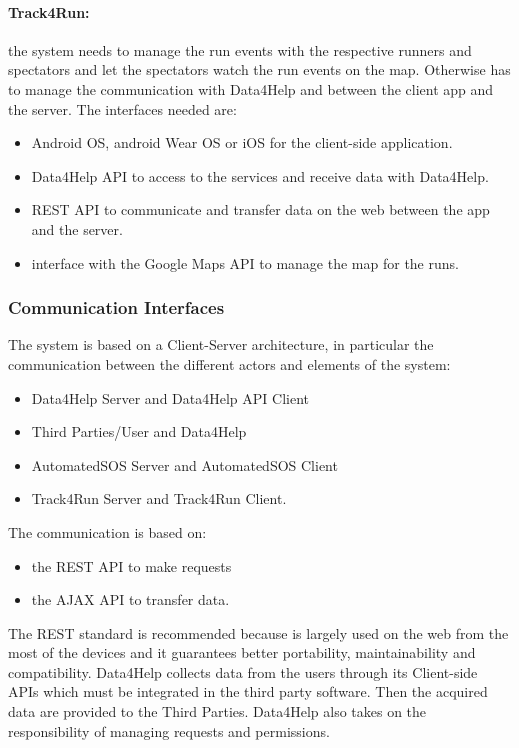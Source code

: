 \documentclass[a4paper]{article}
\begin{document}
\paragraph{Track4Run:} the system needs to manage the run events with the respective runners and spectators and let the spectators watch the run events on the map. Otherwise has to manage the communication with Data4Help and between the client app and the server. The interfaces needed are:

\begin{itemize}
    \item Android OS, android Wear OS or iOS for the client-side application.
    \item Data4Help API to access to the services and receive data with Data4Help.
    \item REST API to communicate and transfer data on the web between the app and the server.
    \item interface with the Google Maps API to manage the map for the runs.
\end{itemize}
\clearpage

\subsubsection{Communication Interfaces}

The system is based on a Client-Server architecture, in particular the communication between the different actors and elements of the system:
\begin{itemize}
    \item Data4Help Server and Data4Help API Client
    \item Third Parties/User and Data4Help
    \item AutomatedSOS Server and AutomatedSOS Client
    \item Track4Run Server and Track4Run Client.
\end{itemize}

The communication is based on: 
\begin{itemize}
    \item the REST API to make requests
    \item the AJAX API to transfer data.
\end{itemize}

The REST standard is recommended because is largely used on the web from the most of the devices and it guarantees better portability, maintainability and compatibility. \newline
Data4Help collects data from the users through its Client-side APIs which must be integrated in the third party software. Then the acquired data are provided to the Third Parties. Data4Help also takes on the responsibility of managing requests and permissions. \clearpage
\end{document}

